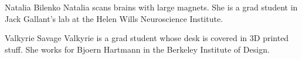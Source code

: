 \documentclass[journal]{IEEEtran}
\begin{document}
%
%
%




% 

\begin{IEEEbiography}{Natalia Bilenko}
Natalia scans brains with large magnets.  She is a grad student in Jack Gallant's lab at the Helen Wills Neuroscience Institute.
\end{IEEEbiography}

\begin{IEEEbiography}{Valkyrie Savage}
Valkyrie is a grad student whose desk is covered in 3D printed stuff.  She works for Bjoern Hartmann in the Berkeley Institute of Design.
\end{IEEEbiography}
\end{document}
